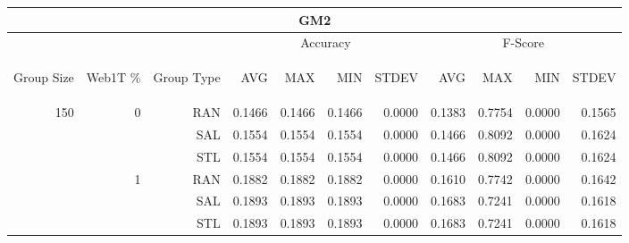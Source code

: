 \begin{center}
\begin{table}[htbp]
\begin{tabular}{ | r | r | r | r | r | r | r | r | r | r | r |}
\hline
\multicolumn{11}{|c|}{GM2}\\
\hline
 & & & \multicolumn{4}{|c|}{Accuracy} & \multicolumn{4}{|c|}{F-Score}\\ \cline{4-11}
\begin{sideways}Group Size\end{sideways} & \begin{sideways}Web1T \%\end{sideways} & \begin{sideways}Group Type\end{sideways} & \begin{sideways}AVG\end{sideways} & \begin{sideways}MAX\end{sideways} & \begin{sideways}MIN\end{sideways} & \begin{sideways}STDEV\end{sideways} & \begin{sideways}AVG\end{sideways} & \begin{sideways}MAX\end{sideways} & \begin{sideways}MIN\end{sideways} & \begin{sideways}STDEV\end{sideways}\\
\hline
\multirow{12}{*}{150}
 & \multirow{3}{*}{0} & RAN & 0.1466 & 0.1466 & 0.1466 & 0.0000 & 0.1383 & 0.7754 & 0.0000 & 0.1565\\ \cline{3-11}
 &   & SAL & 0.1554 & 0.1554 & 0.1554 & 0.0000 & 0.1466 & 0.8092 & 0.0000 & 0.1624\\ \cline{3-11}
 &   & STL & 0.1554 & 0.1554 & 0.1554 & 0.0000 & 0.1466 & 0.8092 & 0.0000 & 0.1624\\ \cline{2-11}
 & \multirow{3}{*}{1} & RAN & 0.1882 & 0.1882 & 0.1882 & 0.0000 & 0.1610 & 0.7742 & 0.0000 & 0.1642\\ \cline{3-11}
 &   & SAL & 0.1893 & 0.1893 & 0.1893 & 0.0000 & 0.1683 & 0.7241 & 0.0000 & 0.1618\\ \cline{3-11}
 &   & STL & 0.1893 & 0.1893 & 0.1893 & 0.0000 & 0.1683 & 0.7241 & 0.0000 & 0.1618\\ \cline{2-11}

\end{tabular}
\end{table}
\end{center}
